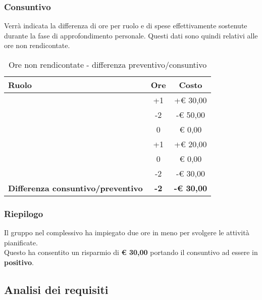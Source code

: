 		\subsubsection{Consuntivo} %
		\label{ssub:consuntivo}
		Verrà indicata la differenza di ore per ruolo e di spese effettivamente sostenute durante la fase di approfondimento personale. Questi dati sono quindi relativi alle ore non rendicontate.
		\begin{table}[!h]
			\begin{center}
				\begin{tabularx}{0.75\textwidth}{|X|c|c|}
					\hline
					\textbf{Ruolo} & \textbf{Ore} & \textbf{Costo} \\
					\hline
					\roleProjectManager & +1 & +\euro{} 30,00 \\
					\hline
					\roleAnalyst & -2 & -\euro{} 50,00 \\
					\hline
					\roleDesigner & 0 & \euro{} 0,00 \\
					\hline
					\roleAdministrator & +1 & +\euro{} 20,00 \\
					\hline
					\roleProgrammer & 0 & \euro{} 0,00 \\
					\hline
					\roleVerifier & -2 & -\euro{} 30,00 \\
					\hline
					\textbf{Differenza consuntivo/preventivo } & \textbf{-2} & \textbf{-\euro{} 30,00} \\
					\hline
				\end{tabularx}
			\end{center}
		\caption{Ore non rendicontate - differenza preventivo/consuntivo}
		\end{table}
		
		\subsubsection{Riepilogo} %
		\label{ssub:riepilogo}
		Il gruppo nel complessivo ha impiegato due ore in meno per svolgere le attività pianificate. \\
		Questo ha consentito un risparmio di \textbf{\euro{} 30,00} portando il consuntivo ad essere in \textbf{positivo}. 
		
	\newpage
	\subsection{Analisi dei requisiti} %
	\label{sub:analisi_dei_requisiti}
